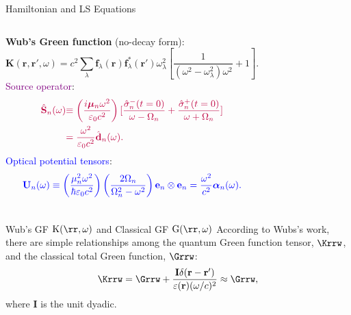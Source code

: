 \documentclass{beamer}
\begin{document}
\begin{frame}{Hamiltonian and LS Equations}
\begin{columns}
\fontsize{6.8}{-0.2}\selectfont
\textbf{Wub's Green function} (no-decay form):
\begin{equation}
 \label{K}
 \mathbf{K}(\mathbf{r},\mathbf{r}',\omega)=c^2\sum_\lambda \mathbf{f}_\lambda(\mathbf{r})\mathbf{f}_\lambda^*(\mathbf{r}')\omega_\lambda^2\left[ \frac{1}
{(\omega^2-\omega_\lambda^2){\omega^2}}+1 \right].\nonumber
\end{equation}
\textcolor{purple}{Source operator}:
\begin{align}
 \label{source}
 \color{purple}{\hat{\mathbf{S}}_n(\omega)} &\color{purple}{\equiv \left(\frac{i{\bm \mu}_n\omega^2}{\varepsilon_0c^2}\right)
\lbrack\frac{\hat{\sigma}_n^-(t=0)}{\omega-\Omega_n}+\frac{\hat{\sigma}_n^+(t=0)}{\omega+\Omega_n}\rbrack} \nonumber\\
&\color{purple}{=\frac{\omega^2}{\varepsilon_0c^2}\hat{\mathbf{d}}_n(\omega)}.\nonumber  
\end{align}
\textcolor{blue}{Optical potential tensors}:
\begin{equation}
 \label{Un}
\color{blue}{ \mathbf{U}_n(\omega) \equiv \left(\frac{\mu_n^2\omega^2}{\hbar\varepsilon_0c^2}\right)
\left(\frac{2\Omega_n}{\Omega_n^2-\omega^2}\right)\mathbf{e}_n \otimes \mathbf{e}_n=\frac{\omega^2}{c^2}{\bm \alpha}_n(\omega)}. \nonumber
\end{equation}

\end{columns}
\end{frame}

%

\begin{frame}{Wub's GF $\mathrm{K}(\rr,\omega)$ and Classical GF $\mathrm{G}(\rr,\omega)$}
According to Wubs's work, there are simple relationships among the quantum Green function tensor, $\Krrw$, 
and the classical total Green function, $\Grrw$:
\begin{equation}
 \label{KG}
 \Krrw=\Grrw+\frac{\mathbf{I}\delta(\mathbf{r}-\mathbf{r}')}{\varepsilon(\mathbf{r})(\omega/c)^2}
\approx \Grrw, \nonumber %
\end{equation}
where $\mathbf{I}$ is the unit dyadic. 
\end{frame}
\end{document}
